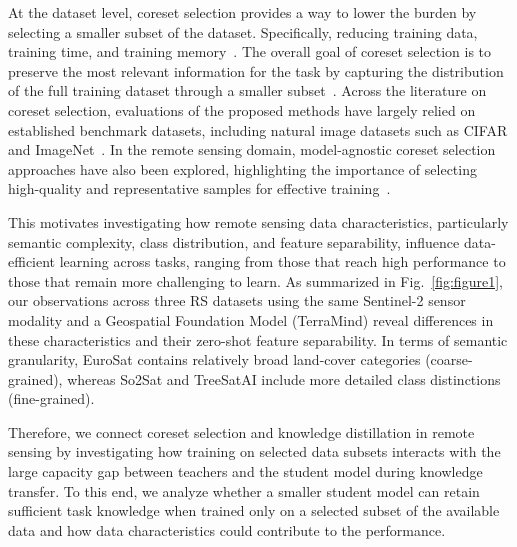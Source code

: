 \documentclass[conference]{IEEEtran}
\begin{document}
At the dataset level, coreset selection provides a way to lower the burden by selecting a smaller subset of the dataset.
Specifically, reducing training data, training time, and training memory~\cite{hashim2026coreset}.
The overall goal of coreset selection is to preserve the most relevant information for the task by capturing the distribution of the full training dataset through a smaller subset~\cite{hashim2026coreset,moser2025coreset}.
Across the literature on coreset selection, evaluations of the proposed methods have largely relied on established benchmark datasets, including natural image datasets such as CIFAR and ImageNet~\cite{moser2025coreset, mohanty2026enhancing, ben2024distilling}.
In the remote sensing domain, model-agnostic coreset selection approaches have also been explored, highlighting the importance of selecting high-quality and representative samples for effective training~\cite{nogueira2026core}.

This motivates investigating how remote sensing data characteristics, particularly semantic complexity, class distribution, and feature separability, influence data-efficient learning across tasks, ranging from those that reach high performance to those that remain more challenging to learn.
As summarized in Fig.~\ref{fig:figure1}, our observations across three RS datasets using the same Sentinel-2 sensor modality and a Geospatial Foundation Model (TerraMind) reveal differences in these characteristics and their zero-shot feature separability.
In terms of semantic granularity, EuroSat contains relatively broad land-cover categories (coarse-grained), whereas So2Sat and TreeSatAI include more detailed class distinctions (fine-grained).

Therefore, we connect coreset selection and knowledge distillation in remote sensing by investigating how training on selected data subsets interacts with the large capacity gap between teachers and the student model during knowledge transfer.
To this end, we analyze whether a smaller student model can retain sufficient task knowledge when trained only on a selected subset of the available data and how data characteristics could contribute to the performance.
\end{document}
